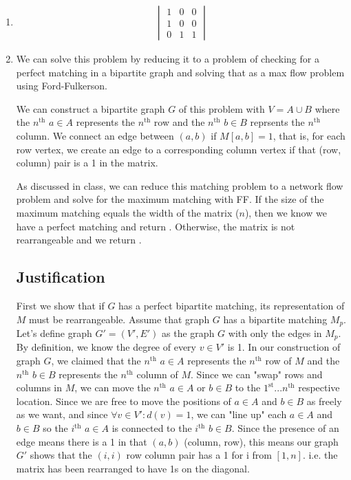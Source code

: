 \documentclass{article}
\begin{document}
\begin{enumerate}
    \item 
    \begin{align*}
        \begin{vmatrix}
            1 & 0 & 0 \\
            1 & 0 & 0 \\
            0 & 1 & 1
        \end{vmatrix}
    \end{align*}
    
    \item We can solve this problem by reducing it to a problem of checking for a perfect matching in a bipartite graph and solving that as a max flow problem using Ford-Fulkerson. 
    
    We can construct a bipartite graph $G$ of this problem with $V = A \cup B$ where the $n^{\text{th}}$ $a\in A$ represents the $n^{\text{th}}$ row and the $n^{\text{th}}$ $b \in B$ reprsents the $n^{\text{th}}$ column.
    We connect an edge between $(a, b)$ if $M[a, b] = 1$, that is, for each row vertex, we create an edge to a corresponding column vertex if that (row, column) pair is a 1 in the matrix.
        
    As discussed in class, we can reduce this matching problem to a network flow problem and solve for the maximum matching with FF.
    If the size of the maximum matching equals the width of the matrix ($n$), then we know we have a perfect matching and return \True. Otherwise, the matrix is not rearrangeable and we return \False.

    \subsection{Justification}
    First we show that if $G$ has a perfect bipartite matching, its representation of $M$ must be rearrangeable.
    Assume that graph $G$ has a bipartite matching $M_p$. Let's define graph $G' = (V', E')$ as the graph $G$ with only the edges in $M_p$.
    By definition, we know the degree of every $v \in V'$ is 1.
    In our construction of graph $G$, we claimed that the $n^{\text{th}}$ $a\in A$ represents the $n^{\text{th}}$ row of $M$
    and the $n^{\text{th}}$ $b\in B$ represents the $n^{\text{th}}$ column of $M$. Since we can "swap" rows and columns in $M$, we can move the $n^{\text{th}}$ $a\in A$ or $b\in B$ to the $1^{\text{st}}...n^{\text{th}}$ respective location.
    Since we are free to move the positions of $a\in A$ and $b\in B$ as freely as we want, and since $\forall v\in V': d(v) = 1$, we can "line up" each $a\in A$ and $b\in B$ so the $i^{\text{th}}$ $a\in A$ is connected to the $i^{\text{th}}$ $b\in B$.
    Since the presence of an edge means there is a 1 in that $(a, b)$ (column, row), this means our graph $G'$ shows that the $(i, i)$ row column pair has a 1 for i from $[1, n]$. i.e. the matrix has been rearranged to have 1s on the diagonal.


\end{enumerate}
\end{document}
